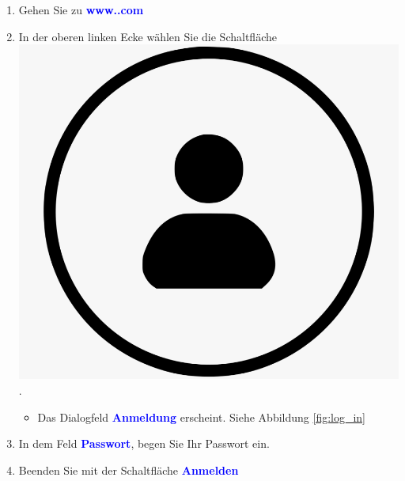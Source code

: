 \documentclass{article}
\newif\ifproductOne
\newif\ifproductTwo
\newif\ifproductThree
\begin{document}
\begin{enumerate}
	\item Gehen Sie zu \textbf{\textcolor{blue}{www.\manufacturer.com}}
	\item In der oberen linken Ecke wählen Sie die Schaltfläche \includegraphics[height=\baselineskip]{log_in}.
	\begin{itemize}
		\item Das Dialogfeld \textbf{\textcolor{blue}{Anmeldung}} erscheint. Siehe Abbildung \ref{fig:log_in}
	\end{itemize}	 
	\ifproductOne
	\item In dem Feld \textbf{\textcolor{blue}{Email}}, geben Sie Ihre Email Adresse ein. 
	\else
	\fi
	\ifproductTwo
	\item In dem Feld \textbf{\textcolor{blue}{Google user}}, geben Sie Ihren Google-Benutzernamen 		ein. 
	\else
	\fi
	\ifproductThree
	\item In dem Feld \textbf{\textcolor{blue}{Facebook user}}, geben Sie Ihren Facebook-Benutzernamen ein. 
	\else
	\fi
	\item In dem Feld \textbf{\textcolor{blue}{Passwort}}, begen Sie Ihr Passwort ein. 
	\item Beenden Sie mit der Schaltfläche \textbf{\textcolor{blue}{Anmelden}}
\end{enumerate}
\end{document}

